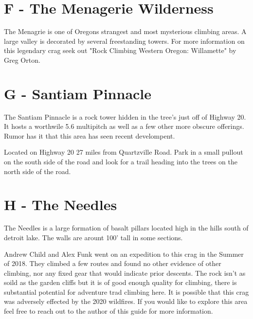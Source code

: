 \begin{multicols}{2}
\needspace{6em}

\section{F - The Menagerie Wilderness}\label{sa:The Menagerie Wilderness}
The Menagrie is one of Oregons strangest and most mysterious climbing areas. A large valley is decorated by several freestanding towers. For more information on this legendary crag seek out "Rock Climbing Western Oregon: Willamette" by Greg Orton.\\




\needspace{6em}

\section{G - Santiam Pinnacle}\label{sa:Santiam Pinnacle}
The Santiam Pinnacle is a rock tower hidden in the tree's just off of Highway 20. It hosts a worthwile 5.6 multipitch as well as a few other more obscure offerings. Rumor has it that this area has seen recent develompent.

Located on Highway 20 27 miles from Quartzville Road. Park in a small pullout on the south side of the road and look for a trail heading into the trees on the north side of the road.\\




\needspace{6em}

\section{H - The Needles}\label{sa:The Needles}
The Needles is a large formation of basalt pillars located high in the hills south of detroit lake. The walls are arount 100' tall in some sections.

Andrew Child and Alex Funk went on an expedition to this crag in the Summer of 2018. They climbed a few routes and found no other evidence of other climbing, nor any fixed gear that would indicate prior descents. The rock isn't as soild as the garden cliffs but it is of good enough quality for climbing, there is substantial potential for adventure trad climbing here. It is possible that this crag was adversely effected by the 2020 wildfires. If you would like to explore this area feel free to reach out to the author of this guide for more information.\\





\end{multicols}
\clearpage